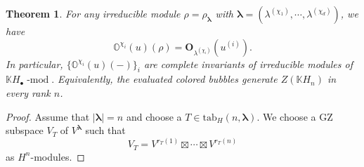 \documentclass[12pt]{amsart}
\numberwithin{itemcounter}{subsection}
\theoremstyle{plain}
\newtheorem{theorem}{Theorem}[section]
\theoremstyle{definition}
\theoremstyle{remark}
\numberwithin{equation}{section}
\def\bbK{\mathbb{K}}
\def\bbO{\mathbb{O}}
\def\bfO{\mathbf{O}}
\def\mod{\operatorname{-mod}\nolimits}
\newcommand*{\tuple}[1]
{\boldsymbol{#1}}
\begin{document}
		\begin{theorem}\label{cwf}
			For any irreducible module $\rho= \rho_{\tuple \lambda}$ with $\tuple \lambda = (\lambda^{(\chi_1)},\cdots, \lambda^{(\chi_d)})$, we have
		$$\bbO^{\chi_i} (u)(\rho) = \bfO_{\lambda^{(\chi_i)}} (u^{(i)}).$$
			In particular, $\{\bbO^{\chi_i}(u)(-)\}_{i}$ are complete invariants of irreducible modules of $\bbK H _{\bullet}\mod.$
            Equivalently, the evaluated colored bubbles generate $Z(\bbK H_n)$ in every rank $n$.
									\end{theorem}
									\begin{proof}

										Assume that $|\tuple\lambda|=n$ and choose a $T\in \mathrm{tab}_H(n,\tuple\lambda).$
										We choose a GZ subspace $V_T$ of $V^{\tuple\lambda}$ such that $$V_T=V^{r_T(1)}\boxtimes \cdots \boxtimes V^{r_T(n)}$$ as $ H ^n$-modules.


\end{proof}
\end{document}
